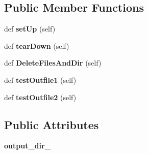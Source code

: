 \subsection*{Public Member Functions}
\begin{DoxyCompactItemize}
\item 
def {\bfseries set\+Up} (self)\hypertarget{classgtest__xml__outfiles__test_1_1GTestXMLOutFilesTest_a56550f293277d18c36e868a637fe1153}{}\label{classgtest__xml__outfiles__test_1_1GTestXMLOutFilesTest_a56550f293277d18c36e868a637fe1153}

\item 
def {\bfseries tear\+Down} (self)\hypertarget{classgtest__xml__outfiles__test_1_1GTestXMLOutFilesTest_a49d1d410370ba8a3cfcc281eaadb5706}{}\label{classgtest__xml__outfiles__test_1_1GTestXMLOutFilesTest_a49d1d410370ba8a3cfcc281eaadb5706}

\item 
def {\bfseries Delete\+Files\+And\+Dir} (self)\hypertarget{classgtest__xml__outfiles__test_1_1GTestXMLOutFilesTest_a503d2fbc9cd782ae57ac4307d2db43e1}{}\label{classgtest__xml__outfiles__test_1_1GTestXMLOutFilesTest_a503d2fbc9cd782ae57ac4307d2db43e1}

\item 
def {\bfseries test\+Outfile1} (self)\hypertarget{classgtest__xml__outfiles__test_1_1GTestXMLOutFilesTest_a034738bbc00ac46d00f183402c561228}{}\label{classgtest__xml__outfiles__test_1_1GTestXMLOutFilesTest_a034738bbc00ac46d00f183402c561228}

\item 
def {\bfseries test\+Outfile2} (self)\hypertarget{classgtest__xml__outfiles__test_1_1GTestXMLOutFilesTest_a3c02687f092a482d0d0260c7ed94c618}{}\label{classgtest__xml__outfiles__test_1_1GTestXMLOutFilesTest_a3c02687f092a482d0d0260c7ed94c618}

\end{DoxyCompactItemize}
\subsection*{Public Attributes}
\begin{DoxyCompactItemize}
\item 
{\bfseries output\+\_\+dir\+\_\+}\hypertarget{classgtest__xml__outfiles__test_1_1GTestXMLOutFilesTest_aa5c31cd97047bc1d3060f4d27bc956a4}{}\label{classgtest__xml__outfiles__test_1_1GTestXMLOutFilesTest_aa5c31cd97047bc1d3060f4d27bc956a4}

\end{DoxyCompactItemize}
